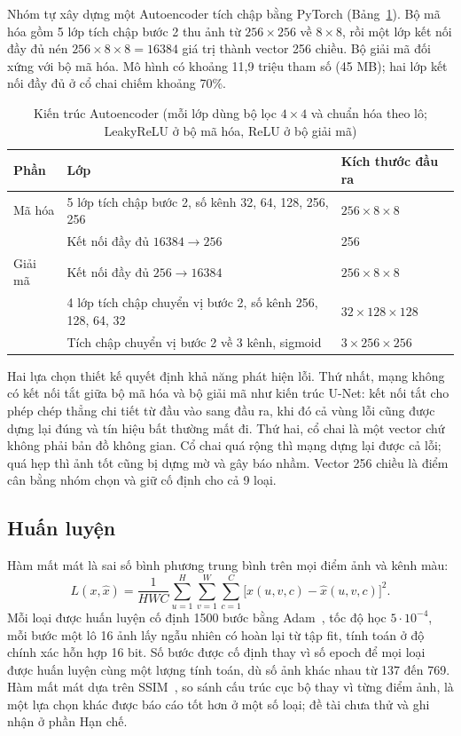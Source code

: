 Nhóm tự xây dựng một Autoencoder tích chập bằng PyTorch (Bảng~\ref{tab:ae-arch}). Bộ mã hóa gồm 5 lớp tích chập
bước 2 thu ảnh từ $256\times256$ về $8\times8$, rồi một lớp kết nối đầy đủ nén $256\times8\times8 = 16384$ giá trị
thành vector 256 chiều. Bộ giải mã đối xứng với bộ mã hóa. Mô hình có khoảng 11,9 triệu tham số (45 MB); hai lớp
kết nối đầy đủ ở cổ chai chiếm khoảng 70\%.

\begin{table}[htbp]
  \centering
  \caption[Kiến trúc Autoencoder]{Kiến trúc Autoencoder (mỗi lớp dùng bộ lọc $4\times4$ và chuẩn hóa theo lô; LeakyReLU ở bộ mã hóa, ReLU ở bộ giải mã)}
  \label{tab:ae-arch}
  \small
  \begin{tabular}{@{}lll@{}}
    \toprule
    Phần & Lớp & Kích thước đầu ra \\
    \midrule
    Mã hóa  & 5 lớp tích chập bước 2, số kênh 32, 64, 128, 256, 256 & $256\times8\times8$ \\
            & Kết nối đầy đủ $16384 \to 256$ & 256 \\
    Giải mã & Kết nối đầy đủ $256 \to 16384$ & $256\times8\times8$ \\
            & 4 lớp tích chập chuyển vị bước 2, số kênh 256, 128, 64, 32 & $32\times128\times128$ \\
            & Tích chập chuyển vị bước 2 về 3 kênh, sigmoid & $3\times256\times256$ \\
    \bottomrule
  \end{tabular}
\end{table}

Hai lựa chọn thiết kế quyết định khả năng phát hiện lỗi. Thứ nhất, mạng không có kết nối tắt giữa bộ mã hóa và bộ
giải mã như kiến trúc U-Net: kết nối tắt cho phép chép thẳng chi tiết từ đầu vào sang đầu ra, khi đó cả vùng lỗi
cũng được dựng lại đúng và tín hiệu bất thường mất đi. Thứ hai, cổ chai là một vector chứ không phải bản đồ không
gian. Cổ chai quá rộng thì mạng dựng lại được cả lỗi; quá hẹp thì ảnh tốt cũng bị dựng mờ và gây báo nhầm.
Vector 256 chiều là điểm cân bằng nhóm chọn và giữ cố định cho cả 9 loại.

\subsection{Huấn luyện}
\label{sec:ae-train}

Hàm mất mát là sai số bình phương trung bình trên mọi điểm ảnh và kênh màu:
\begin{equation}
  L(x,\hat{x}) = \frac{1}{HWC}\sum_{u=1}^{H}\sum_{v=1}^{W}\sum_{c=1}^{C}
  \bigl[x(u,v,c) - \hat{x}(u,v,c)\bigr]^{2} .
  \label{eq:ae-loss}
\end{equation}
Mỗi loại được huấn luyện cố định 1500 bước bằng Adam~\cite{kingmaAdamMethodStochastic2015}, tốc độ học
$5\cdot10^{-4}$, mỗi bước một lô 16 ảnh lấy ngẫu nhiên có hoàn lại từ tập fit, tính toán ở độ chính xác hỗn hợp 16
bit. Số bước được cố định thay vì số epoch để mọi loại được huấn luyện cùng một lượng tính toán, dù số ảnh khác nhau
từ 137 đến 769. Hàm mất mát dựa trên SSIM~\cite{bergmannImprovingUnsupervisedDefect2019}, so sánh cấu trúc cục bộ
thay vì từng điểm ảnh, là một lựa chọn khác được báo cáo tốt hơn ở một số loại; đề tài chưa thử và ghi nhận ở phần
Hạn chế.

